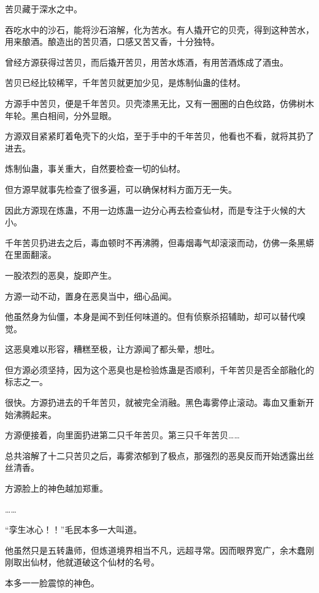 
\begin{this_body}



苦贝藏于深水之中。

吞吃水中的沙石，能将沙石溶解，化为苦水。有人撬开它的贝壳，得到这种苦水，用来酿酒。酿造出的苦贝酒，口感又苦又香，十分独特。

曾经方源获得过苦贝，而后撬开苦贝，用苦水炼酒，有用苦酒炼成了酒虫。

苦贝已经比较稀罕，千年苦贝就更加少见，是炼制仙蛊的佳材。

方源手中苦贝，便是千年苦贝。贝壳漆黑无比，又有一圈圈的白色纹路，仿佛树木年轮。黑白相间，分外显眼。

方源双目紧紧盯着龟壳下的火焰，至于手中的千年苦贝，他看也不看，就将其扔了进去。

炼制仙蛊，事关重大，自然要检查一切的仙材。

但方源早就事先检查了很多遍，可以确保材料方面万无一失。

因此方源现在炼蛊，不用一边炼蛊一边分心再去检查仙材，而是专注于火候的大小。

千年苦贝扔进去之后，毒血顿时不再沸腾，但毒烟毒气却滚滚而动，仿佛一条黑蟒在里面翻滚。

一股浓烈的恶臭，旋即产生。

方源一动不动，置身在恶臭当中，细心品闻。

他虽然身为仙僵，本身是闻不到任何味道的。但有侦察杀招辅助，却可以替代嗅觉。

这恶臭难以形容，糟糕至极，让方源闻了都头晕，想吐。

但方源必须坚持，因为这个恶臭也是检验炼蛊是否顺利，千年苦贝是否全部融化的标志之一。

很快。方源扔进去的千年苦贝，就被完全消融。黑色毒雾停止滚动。毒血又重新开始沸腾起来。

方源便接着，向里面扔进第二只千年苦贝。第三只千年苦贝……

总共溶解了十二只苦贝之后，毒雾浓郁到了极点，那强烈的恶臭反而开始透露出丝丝清香。

方源脸上的神色越加郑重。

……

“孪生冰心！！”毛民本多一大叫道。

他虽然只是五转蛊师，但炼道境界相当不凡，远超寻常。因而眼界宽广，余木蠢刚刚取出仙材，他就道破这个仙材的名号。

本多一一脸震惊的神色。


\end{this_body}

